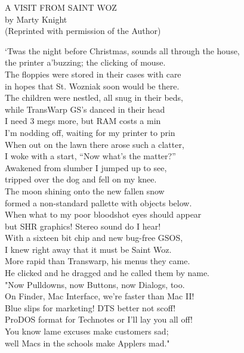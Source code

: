 \documentclass{report}
\newenvironment{usenet}{\begin{addmargin}{0.5in}\raggedright\small\ttfamily}{\rmfamily\end{addmargin}}
\begin{document}
	\begin{usenet}
		A VISIT FROM SAINT WOZ\\
		by Marty Knight\\
		(Reprinted with permission of the Author)

		`Twas the night before Christmas, sounds all through the house,\\
		the printer a'buzzing; the clicking of mouse.\\
		The floppies were stored in their cases with care\\
		in hopes that St. Wozniak soon would be there.\\
		The children were nestled, all snug in their beds,\\
		while TransWarp GS's danced in their head\\
		I need 3 megs more, but RAM costs a min\\
		I'm nodding off, waiting for my printer to prin\\
		When out on the lawn there arose such a clatter,\\
		I woke with a start, ``Now what's the matter?''\\
		Awakened from slumber I jumped up to see,\\
		tripped over the dog and fell on my knee.\\
		The moon shining onto the new fallen snow\\
		formed a non-standard pallette with objects below.\\
		When what to my poor bloodshot eyes should appear\\
		but SHR graphics! Stereo sound do I hear!\\
		With a sixteen bit chip and new bug-free GSOS,\\
		I knew right away that it must be Saint Woz.\\
		More rapid than Transwarp, his menus they came.\\
		He clicked and he dragged and he called them by name.\\
		"Now Pulldowns, now Buttons, now Dialogs, too.\\
		On Finder, Mac Interface, we're faster than Mac II!\\
		Blue slips for marketing! DTS better not scoff!\\
		ProDOS format for Technotes or I'll lay you all off!\\
		You know lame excuses make customers sad;\\
		well Macs in the schools make Applers mad."\\

\end{usenet}
\end{document}
